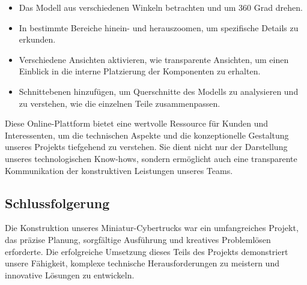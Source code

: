 \begin{itemize}
    \item Das Modell aus verschiedenen Winkeln betrachten und um 360 Grad drehen.
    \item In bestimmte Bereiche hinein- und herauszoomen, um spezifische Details zu erkunden.
    \item Verschiedene Ansichten aktivieren, wie transparente Ansichten, um einen Einblick in die interne Platzierung der Komponenten zu erhalten.
    \item Schnittebenen hinzufügen, um Querschnitte des Modells zu analysieren und zu verstehen, wie die einzelnen Teile zusammenpassen.
\end{itemize}

Diese Online-Plattform bietet eine wertvolle Ressource für Kunden und Interessenten, um die technischen Aspekte und die konzeptionelle Gestaltung unseres Projekts tiefgehend zu verstehen. Sie dient nicht nur der Darstellung unseres technologischen Know-hows, sondern ermöglicht auch eine transparente Kommunikation der konstruktiven Leistungen unseres Teams.


\subsection{Schlussfolgerung}
Die Konstruktion unseres Miniatur-Cybertrucks war ein umfangreiches Projekt, das präzise Planung, sorgfältige Ausführung und kreatives Problemlösen erforderte. Die erfolgreiche Umsetzung dieses Teils des Projekts demonstriert unsere Fähigkeit, komplexe technische Herausforderungen zu meistern und innovative Lösungen zu entwickeln.

\newpage
